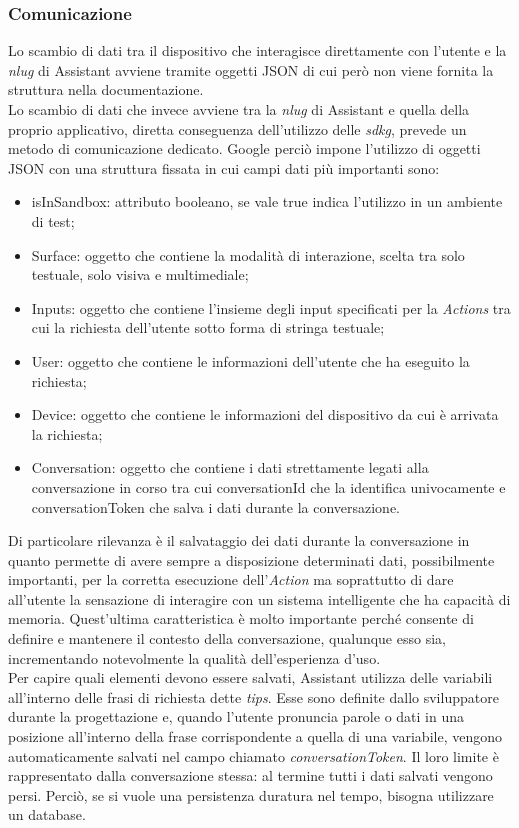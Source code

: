 		\subsubsection{Comunicazione}
		Lo scambio di dati tra il dispositivo che interagisce direttamente con l'utente e la \emph{\gls{nlug}} di Assistant avviene tramite oggetti JSON di cui però non viene fornita la struttura nella documentazione. \\
		Lo scambio di dati che invece avviene tra la \emph{\gls{nlug}} di Assistant e quella della proprio applicativo, diretta conseguenza dell'utilizzo delle \emph{\gls{sdkg}}, prevede un metodo di comunicazione dedicato. Google perciò impone l'utilizzo di oggetti JSON con una struttura fissata in cui campi dati più importanti sono:
		\begin{itemize}
			\item isInSandbox: attributo booleano, se vale true indica l'utilizzo in un ambiente di test;
			\item Surface: oggetto che contiene la modalità di interazione, scelta tra solo testuale, solo visiva e multimediale;
			\item Inputs: oggetto che contiene l'insieme degli input specificati per la \emph{Actions} tra cui la richiesta dell'utente sotto forma di stringa testuale;
			\item User: oggetto che contiene le informazioni dell'utente che ha eseguito la richiesta;
			\item Device: oggetto che contiene le informazioni del dispositivo da cui è arrivata la richiesta;
			\item Conversation: oggetto che contiene i dati strettamente legati alla conversazione in corso tra cui conversationId che la identifica univocamente e conversationToken che salva i dati durante la conversazione.
		\end{itemize}
		Di particolare rilevanza è il salvataggio dei dati durante la conversazione in quanto permette di avere sempre a disposizione determinati dati, possibilmente importanti, per la corretta esecuzione dell'\emph{Action} ma soprattutto di dare all'utente la sensazione di interagire con un sistema intelligente che ha capacità di memoria. Quest'ultima caratteristica è molto importante perché consente di definire e mantenere il contesto della conversazione, qualunque esso sia, incrementando notevolmente la qualità dell'esperienza d'uso. \\
		Per capire quali elementi devono essere salvati, Assistant utilizza delle variabili all'interno delle frasi di richiesta dette \emph{tips}. Esse sono definite dallo sviluppatore durante la progettazione e, quando l'utente pronuncia parole o dati in una posizione all'interno della frase corrispondente a quella di una variabile, vengono automaticamente salvati nel campo chiamato \emph{conversationToken}. Il loro limite è rappresentato dalla conversazione stessa: al termine tutti i dati salvati vengono persi. Perciò, se si vuole una persistenza duratura nel tempo, bisogna utilizzare un database.
